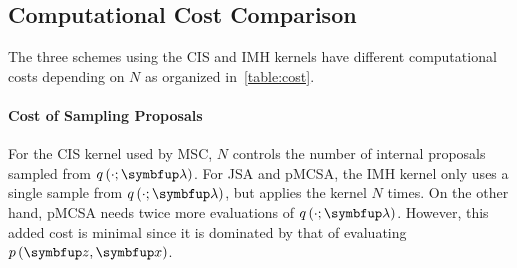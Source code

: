 
\begin{wraptable}[13]{r}{0.55\textwidth}
  \vspace{-5ex}
  \centering
  
\end{wraptable}
%
\vspace{-1.5ex}
\subsection{Computational Cost Comparison}
\vspace{-1.5ex}
The three schemes using the CIS and IMH kernels have different computational costs depending on \(N\) as organized in~\cref{table:cost}.

\vspace{-1.5ex}
\paragraph{Cost of Sampling Proposals}
For the CIS kernel used by MSC, \(N\) controls the number of internal proposals sampled from \(q\,(\cdot; \vlambda)\).
For JSA and pMCSA, the IMH kernel only uses a single sample from \(q\,(\cdot; \vlambda)\), but applies the kernel \(N\) times.
On the other hand, pMCSA needs twice more evaluations of \(q\,(\cdot; \vlambda)\).
However, this added cost is minimal since it is dominated by that of evaluating \(p\,(\vz,\vx)\).

